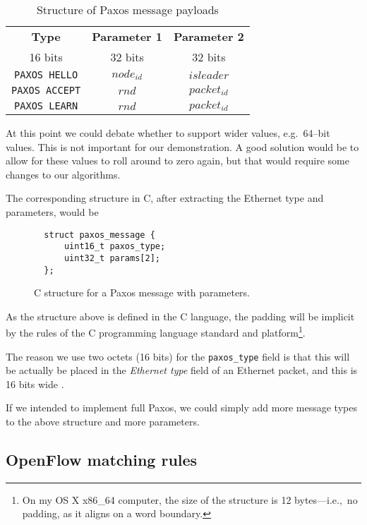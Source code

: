 \begin{table}[H]
  \centering
  \begin{tabular}{|c|c|c|}
    \hline \textbf{Type} & \textbf{Parameter 1} & \textbf{Parameter 2} \\
           16 bits & 32 bits & 32 bits \\
    \hline \texttt{PAXOS HELLO} & $node_{id}$ & $isleader$ \\
    \hline \texttt{PAXOS ACCEPT} & $rnd$ & $packet_{id}$ \\
    \hline \texttt{PAXOS LEARN} & $rnd$ & $packet_{id}$ \\
    \hline
  \end{tabular}
  \caption{Structure of Paxos message payloads}
  \label{table:paxos.payload.structure}
\end{table}

At this point we
could debate whether to support wider values, e.g.~64--bit values.
This is not important for our demonstration.  A good solution would be to
allow for these values to roll around to zero again, but that would require
some changes to our algorithms.

The corresponding structure in C, after extracting the Ethernet type and
parameters, would be

\begin{figure}[H]
  \begin{Verbatim}
  struct paxos_message {
      uint16_t paxos_type;
      uint32_t params[2];
  };
  \end{Verbatim}
  \caption{C structure for a Paxos message with parameters.}
  \label{struct:paxos.message}
\end{figure}

As the structure above is defined in the C language, the padding will be
implicit by the rules of the C programming language standard and
platform\footnote{On my OS X x86\_{}64 computer, the size of the structure
is 12 bytes---i.e.,~no padding, as it aligns on a word boundary.}.

The reason we use two octets (16 bits) for the \texttt{paxos\_{}type} field
is that this will be actually be placed in the \textit{Ethernet type} field
of an Ethernet packet, and this is 16 bits wide \cite{IEEE.802.3}.

If we intended to implement full Paxos, we could simply add more message
types to the above structure and more parameters.

\subsection{OpenFlow matching rules}

